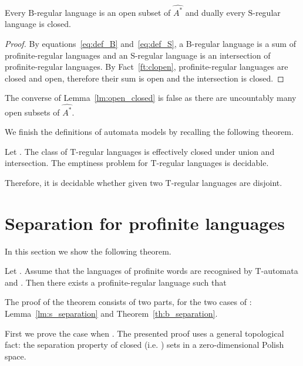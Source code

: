 \documentclass{LMCS}
\newcommand{\fT}{\ensuremath{\mathrm{T}}\xspace}
\newcommand{\fB}{\ensuremath{\mathrm{B}}\xspace}
\newcommand{\fS}{\ensuremath{\mathrm{S}}\xspace}
\newcommand{\prom}[1]{\ensuremath{\widehat{{#1}^\ast}}\xspace}
\begin{document}
\begin{lemma}\label{lm:open_closed}
Every \fB-regular language is an open subset of \prom{A} and dually every \fS-regular language is closed.
\end{lemma}

\begin{proof}
By equations~\eqref{eq:def_B} and~\eqref{eq:def_S}, a \fB-regular language is a sum of profinite-regular languages and an \fS-regular language is an intersection of profinite-regular languages. By Fact~\ref{ft:clopen}, profinite-regular languages are closed and open, therefore their sum is open and the intersection is closed.
\end{proof}

The converse of Lemma~\ref{lm:open_closed} is false as there are uncountably many open subsets of \prom{A}.

We finish the definitions of automata models by recalling the following theorem.

\begin{theorem}\label{th:effective_disjoint}

Let . The class of \fT-regular languages is effectively closed under union and intersection. The emptiness problem for \fT-regular languages is decidable.

Therefore, it is decidable whether given two \fT-regular languages are disjoint.
\end{theorem}



\section{Separation for profinite languages}\label{s:profinite_sep}

In this section we show the following theorem.

\begin{theorem}\label{th:separation}
Let . Assume that the languages of profinite words  are recognised by \fT-automata and . Then there exists a profinite-regular language  such that

\end{theorem}

The proof of the theorem consists of two parts, for the two cases of : Lemma~\ref{lm:s_separation} and Theorem~\ref{th:b_separation}.

First we prove the case when . The presented proof uses a general topological fact: the separation property of closed (i.e. ) sets in a zero-dimensional Polish space.
\end{document}
